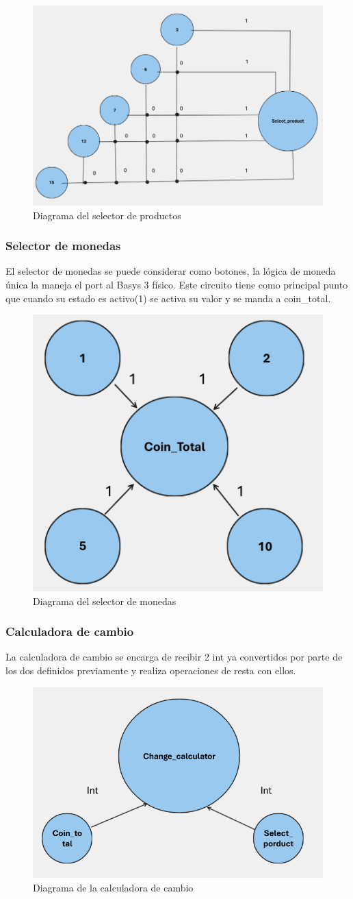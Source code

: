 \documentclass[12pt]{article}  %
\begin{document}
\begin{figure}[!ht]
  \centering
  \caption{Diagrama del selector de productos}
  \includegraphics[width=0.25\linewidth]{Imagenes/Diagramas/product-selector-diagram.png}
\end{figure}

\subsubsection{Selector de monedas}
El selector de monedas se puede considerar como botones, la lógica de moneda única la maneja el port al Basys 3 físico. Este circuito tiene como principal punto que cuando su estado es activo(1) se activa su valor y se manda a coin\_total.

\begin{figure}[!ht]
  \centering
  \caption{Diagrama del selector de monedas}
  \includegraphics[width=0.25\linewidth]{Imagenes/Diagramas/coin-selector-diagram.png}
\end{figure}

\subsubsection{Calculadora de cambio}
La calculadora de cambio se encarga de recibir 2 int ya convertidos por parte de los dos definidos previamente y realiza operaciones de resta con ellos.

\begin{figure}[!ht]
  \centering
  \caption{Diagrama de la calculadora de cambio}
  \includegraphics[width=0.25\linewidth]{Imagenes/Diagramas/change-calculator-diagram.png}
\end{figure}
\end{document}
